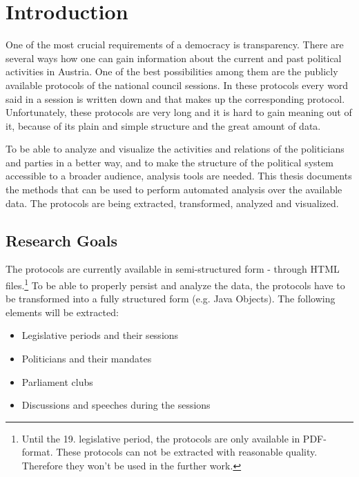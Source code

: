 \chapter{Introduction}
\label{sec:introduction}
One of the most crucial requirements of a democracy is transparency. There are several ways how one can gain information about the current and past political activities in Austria. One of the best possibilities among them are the publicly available protocols of the national council sessions. In these protocols every word said in a session is written down and that makes up the corresponding protocol. Unfortunately, these protocols are very long and it is hard to gain meaning out of it, because of its plain and simple structure and the great amount of data.

To be able to analyze and visualize the activities and relations of the politicians and parties in a better way, and to make the structure of the political system accessible to a broader audience, analysis tools are needed. This thesis documents the methods that can be used to perform automated analysis over the available data. The protocols are being extracted, transformed, analyzed and visualized.

\section{Research Goals}
The protocols are currently available in semi-structured form - through HTML files.\footnote{Until the 19. legislative period, the protocols are only available in PDF-format. These protocols can not be extracted with reasonable quality. Therefore they won't be used in the further work.} To be able to properly persist and analyze the data, the protocols have to be transformed into a fully structured form (e.g. Java Objects). The following elements will be extracted:
\begin{itemize}
  \item Legislative periods and their sessions
  \item Politicians and their mandates
  \item Parliament clubs
  \item Discussions and speeches during the sessions
\end{itemize}

